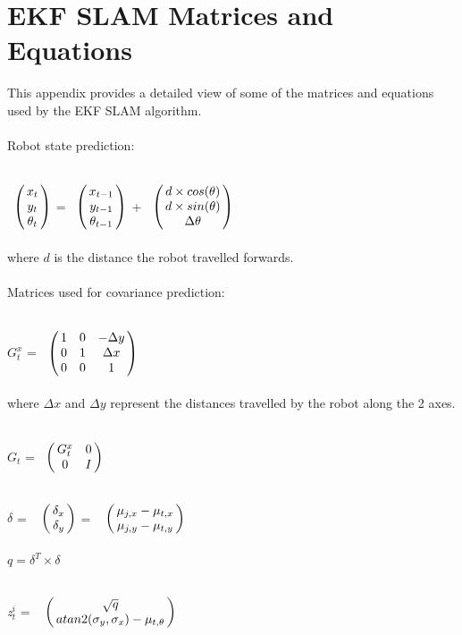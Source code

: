 \documentclass{ba-kecs}
\numberwithin{figure}{section}
\numberwithin{equation}{section}
\begin{document}


\appendix
\section{EKF SLAM Matrices and Equations}
This appendix provides a detailed view of some of the matrices and equations used by the EKF SLAM algorithm.\\ \\
Robot state prediction:

$\bordermatrix{ 	& \cr
                 &x_{t} \cr
                 &y_{t} \cr
                 &\theta_{t} \cr}$
=
$\bordermatrix{ 	& \cr
                 &x_{t-1} \cr
                 &y_{t-1} \cr
                 &\theta_{t-1} \cr}$
+
$\bordermatrix{ 	& \cr
                 &d \times cos(\theta) \cr
                 &d \times sin(\theta) \cr
                 &\Delta\theta \cr}$ \\ \\
where $d$ is the distance the robot travelled forwards. \\ \\
Matrices used for covariance prediction:

$G_t^x$ = 
$\bordermatrix{ 	& \cr
                 &1 & 0 & -\Delta y \cr
                 &0 & 1 & \Delta x \cr
                 &0 & 0 & 1 \cr}$ \\ \\
where $\Delta x$ and $\Delta y$ represent the distances travelled by the robot along the 2 axes.

$G_t$ = 
$\bordermatrix{ 	& \cr
                 &G_t^x & 0 \cr
                 &0 & I \cr}$
                 
$\delta$ = $\bordermatrix{~ \cr
                        & \delta_{x} \cr
                        & \delta_{y}}$ = $\bordermatrix{~ \cr
                                                                                                & \mu_{j,x} - \mu_{t,x} \cr
                                                                & \mu_{j,y} - \mu_{t,y} \cr}$\\ \\

$\textit{q} = \delta^{T} \times \delta$

\textit{z}$^{i}_{t}$ = $\bordermatrix{~ \cr
                        & \sqrt{q} \cr
                        & atan2(\sigma_{y},\sigma_{x}) - \mu_{t,\theta}}$\\ \\
                                          
\end{document}
